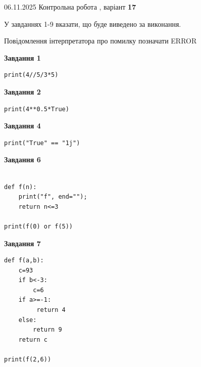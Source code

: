 \documentclass[12pt, ukrainian]{article}
\begin{document}
{\Large{06.11.2025 Контрольна робота , варіант  \No \textbf { 17 }\par}}
{
\begin {large}
У завданнях 1-9 вказати, що буде виведено за виконання.

Повідомлення інтерпретатора про помилку позначати ERROR

\begin{minipage}[t]{7.5cm}

\begin{center}
\textbf{Завдання 1}
\end{center}

\begin{verbatim}
print(4//5/3*5)
\end{verbatim}



\begin{center}
\textbf{Завдання 2}
\end{center}

\begin{verbatim}
print(4**0.5*True)
\end{verbatim}



\begin{center}
\textbf{Завдання 4}
\end{center}

\begin{verbatim}
print("True" == "1j")
\end{verbatim}



\begin{center}
\textbf{Завдання 6}
\end{center}

\begin{verbatim}

def f(n):
    print("f", end="");
    return n<=3

print(f(0) or f(5))
\end{verbatim}



\begin{center}
\textbf{Завдання 7}
\end{center}

\begin{verbatim}
def f(a,b):
    c=93
    if b<-3:
        c=6
    if a>=-1:
         return 4
    else: 
        return 9
    return c

print(f(2,6))
\end{verbatim}


\end{minipage}
\end{large}}
\end{document}
